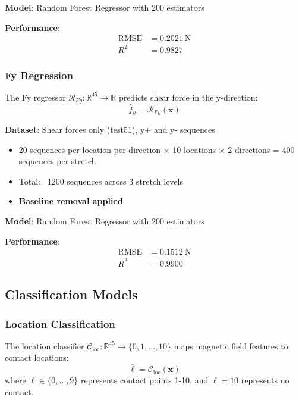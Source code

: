 \documentclass[11pt,a4paper]{article}
\begin{document}
\textbf{Model}: Random Forest Regressor with 200 estimators

\textbf{Performance}:
\begin{align}
\text{RMSE} &= \SI{0.2021}{\newton} \\
R^2 &= 0.9827
\end{align}

\subsubsection{Fy Regression}

The Fy regressor $\mathcal{R}_{Fy}: \mathbb{R}^{45} \rightarrow \mathbb{R}$ predicts shear force in the y-direction:
\begin{equation}
\hat{f}_y = \mathcal{R}_{Fy}(\mathbf{x})
\end{equation}

\textbf{Dataset}: Shear forces only (test51), y+ and y- sequences
\begin{itemize}
    \item 20 sequences per location per direction × 10 locations × 2 directions = 400 sequences per stretch
    \item Total: ~1200 sequences across 3 stretch levels
    \item \textbf{Baseline removal applied}
\end{itemize}

\textbf{Model}: Random Forest Regressor with 200 estimators

\textbf{Performance}:
\begin{align}
\text{RMSE} &= \SI{0.1512}{\newton} \\
R^2 &= 0.9900
\end{align}

\subsection{Classification Models}

\subsubsection{Location Classification}

The location classifier $\mathcal{C}_{\text{loc}}: \mathbb{R}^{45} \rightarrow \{0, 1, \ldots, 10\}$ maps magnetic field features to contact locations:
\begin{equation}
\hat{\ell} = \mathcal{C}_{\text{loc}}(\mathbf{x})
\end{equation}
where $\ell \in \{0, \ldots, 9\}$ represents contact points 1-10, and $\ell = 10$ represents no contact.
\end{document}
